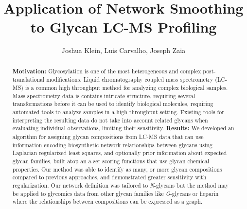 \documentclass{article}
\newcommand{\nglycans}[0]{\textit{N}-glycans\xspace}
\begin{document}
\title{Application of Network Smoothing to Glycan LC-MS Profiling}
\author{Joshua Klein, Luis Carvalho, Joseph Zaia}
\begin{abstract}
\textbf{Motivation:} Glycosylation is one of the most heterogeneous
and complex post-translational modifications. Liquid chromatography
coupled mass spectrometry (LC-MS) is a common high throughput method for
analyzing complex biological samples. Mass spectrometry data is contains
intricate structure, requiring several transformations before it can be
used to identify biological molecules, requiring automated tools to analyze
samples in a high throughput setting. Existing tools for interpreting
the resulting data do not take into account related glycans when evaluating
individual observations, limiting their sensitivity.
\textbf{Results:} We developed an algorithm for assigning glycan compositions
from LC-MS data that can use information encoding biosynthetic network
relationships between glycans using Laplacian regularized least squares,
and optionally prior information about expected glycan families, built atop
an a set scoring functions that use glycan chemical properties. Our method
was able to identify as many, or more glycan compositions compared to
previous approaches, and demonstrated greater sensitivity with regularization.
Our network definition was tailored to \nglycans but the method may be applied
to glycomics data from other glycan families like \textit{O}-glycans or heparin
where the relationships between compositions can be expressed as a graph.
\end{abstract}

\maketitle












\end{document}
